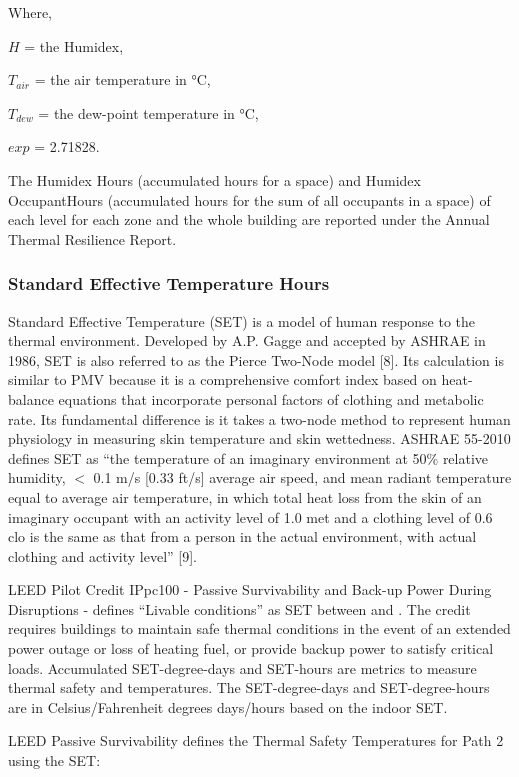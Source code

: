 Where,

$H$ = the Humidex,

$T_{air}$ = the air temperature in \si{\celsius},

$T_{dew}$ = the dew-point temperature in \si{\celsius},

$exp$ = 2.71828.

The Humidex Hours (accumulated hours for a space) and Humidex OccupantHours
(accumulated hours for the sum of all occupants in a space) of each level for
each zone and the whole building are reported under the Annual Thermal
Resilience Report.

\subsubsection{Standard Effective Temperature Hours}\label{set-hour}
Standard Effective Temperature (SET) is a model of human response to the thermal
environment. Developed by A.P. Gagge and accepted by ASHRAE in 1986, SET is also
referred to as the Pierce Two-Node model [8]. Its calculation is similar to PMV
because it is a comprehensive comfort index based on heat-balance equations that
incorporate personal factors of clothing and metabolic rate. Its fundamental
difference is it takes a two-node method to represent human physiology in
measuring skin temperature and skin wettedness. ASHRAE 55-2010 defines SET as
``the temperature of an imaginary environment at 50\% relative humidity, $<$ 0.1
m/s [0.33 ft/s] average air speed, and mean radiant temperature equal to average
air temperature, in which total heat loss from the skin of an imaginary occupant
with an activity level of 1.0 met and a clothing level of 0.6 clo is the same as
that from a person in the actual environment, with actual clothing and activity
level'' [9].

LEED Pilot Credit IPpc100 - Passive Survivability and Back-up Power During
Disruptions - defines ``Livable conditions'' as SET between  and
. The credit requires buildings to maintain safe thermal
conditions in the event of an extended power outage or loss of heating fuel, or
provide backup power to satisfy critical loads. Accumulated SET-degree-days and
SET-hours are metrics to measure thermal safety and temperatures. The SET-degree-days
and SET-degree-hours are in Celsius/Fahrenheit degrees days/hours based on the indoor SET.

LEED Passive Survivability defines the Thermal Safety Temperatures for Path 2
using the SET:

